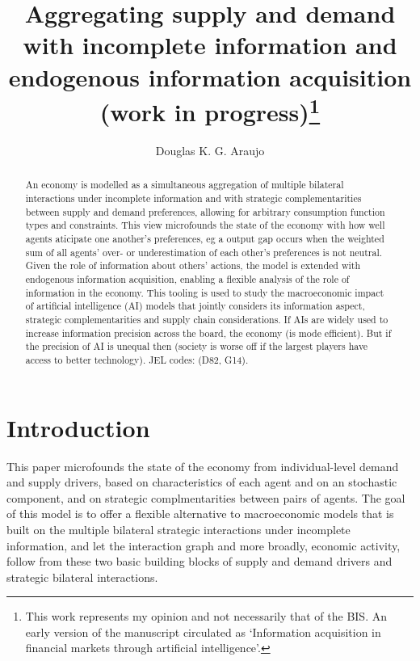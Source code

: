 \documentclass[
]{article}
\title{Aggregating supply and demand with incomplete information and
endogenous information acquisition (work in progress)\thanks{This work
represents my opinion and not necessarily that of the BIS. An early
version of the manuscript circulated as `Information acquisition in
financial markets through artificial intelligence'.}}
\author{Douglas K. G. Araujo}
\affil{%
                  Bank for International
Settlements, douglas.araujo@bis.org
              }
\date{}
\theoremstyle{plain}
\theoremstyle{definition}
\theoremstyle{remark}
\begin{document}
\maketitle
\begin{abstract}
An economy is modelled as a simultaneous aggregation of multiple
bilateral interactions under incomplete information and with strategic
complementarities between supply and demand preferences, allowing for
arbitrary consumption function types and constraints. This view
microfounds the state of the economy with how well agents aticipate one
another's preferences, eg a output gap occurs when the weighted sum of
all agents' over- or underestimation of each other's preferences is not
neutral. Given the role of information about others' actions, the model
is extended with endogenous information acquisition, enabling a flexible
analysis of the role of information in the economy. This tooling is used
to study the macroeconomic impact of artificial intelligence (AI) models
that jointly considers its information aspect, strategic
complementarities and supply chain considerations. If AIs are widely
used to increase information precision across the board, the economy (is
mode efficient). But if the precision of AI is unequal then (society is
worse off if the largest players have access to better technology). JEL
codes: (D82, G14).
\end{abstract}

\section{Introduction}\label{introduction}

This paper microfounds the state of the economy from individual-level
demand and supply drivers, based on characteristics of each agent and on
an stochastic component, and on strategic complmentarities between pairs
of agents. The goal of this model is to offer a flexible alternative to
macroeconomic models that is built on the multiple bilateral strategic
interactions under incomplete information, and let the interaction graph
and more broadly, economic activity, follow from these two basic
building blocks of supply and demand drivers and strategic bilateral
interactions.
\end{document}
